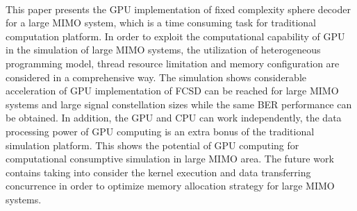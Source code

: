 \documentclass[12pt,a4paper,final]{article}
\begin{document}
\begin{spacing}{2.5}
\paragraph{}This paper presents the GPU implementation of fixed complexity sphere decoder for a large MIMO system, which is a time consuming task for traditional computation platform. In order to exploit the computational capability of GPU in the simulation of large MIMO systems, the utilization of heterogeneous programming model, thread resource limitation and memory configuration are considered in a comprehensive way. The simulation shows considerable acceleration of GPU implementation of FCSD can be reached for large MIMO systems and large signal constellation sizes while the same BER performance can be obtained. In addition, the GPU and CPU can work independently, the data processing power of GPU computing is an extra bonus of the traditional simulation platform. This shows the potential of GPU computing for computational consumptive simulation in large MIMO area. The future work contains taking into consider the kernel execution and data transferring concurrence in order to optimize memory allocation strategy for large MIMO systems.       
\newpage












%
%
%






\end{spacing}


\end{document}
